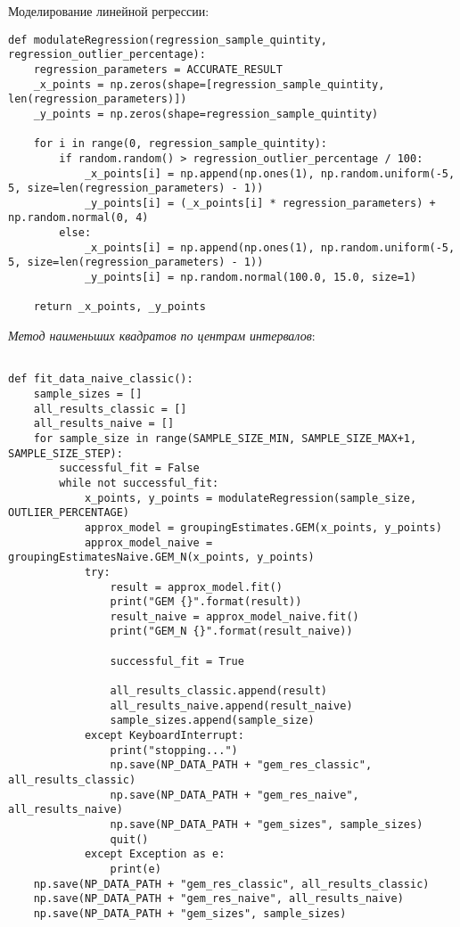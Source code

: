 Моделирование линейной регрессии:
\begin{Verbatim}[fontsize=\scriptsize]
    def modulateRegression(regression_sample_quintity, regression_outlier_percentage):
    regression_parameters = ACCURATE_RESULT
    _x_points = np.zeros(shape=[regression_sample_quintity, len(regression_parameters)])
    _y_points = np.zeros(shape=regression_sample_quintity)

    for i in range(0, regression_sample_quintity):
        if random.random() > regression_outlier_percentage / 100:
            _x_points[i] = np.append(np.ones(1), np.random.uniform(-5, 5, size=len(regression_parameters) - 1))
            _y_points[i] = (_x_points[i] * regression_parameters) + np.random.normal(0, 4)
        else:
            _x_points[i] = np.append(np.ones(1), np.random.uniform(-5, 5, size=len(regression_parameters) - 1))
            _y_points[i] = np.random.normal(100.0, 15.0, size=1)

    return _x_points, _y_points
\end{Verbatim}

\textit{Метод наименьших квадратов по центрам интервалов}:
\begin{Verbatim}[fontsize=\scriptsize]

def fit_data_naive_classic():
    sample_sizes = []
    all_results_classic = []
    all_results_naive = []
    for sample_size in range(SAMPLE_SIZE_MIN, SAMPLE_SIZE_MAX+1, SAMPLE_SIZE_STEP):
        successful_fit = False
        while not successful_fit:
            x_points, y_points = modulateRegression(sample_size, OUTLIER_PERCENTAGE)
            approx_model = groupingEstimates.GEM(x_points, y_points)
            approx_model_naive = groupingEstimatesNaive.GEM_N(x_points, y_points)
            try:
                result = approx_model.fit()
                print("GEM {}".format(result))
                result_naive = approx_model_naive.fit()
                print("GEM_N {}".format(result_naive))

                successful_fit = True

                all_results_classic.append(result)
                all_results_naive.append(result_naive)
                sample_sizes.append(sample_size)
            except KeyboardInterrupt:
                print("stopping...")
                np.save(NP_DATA_PATH + "gem_res_classic", all_results_classic)
                np.save(NP_DATA_PATH + "gem_res_naive", all_results_naive)
                np.save(NP_DATA_PATH + "gem_sizes", sample_sizes)
                quit()
            except Exception as e:
                print(e)
    np.save(NP_DATA_PATH + "gem_res_classic", all_results_classic)
    np.save(NP_DATA_PATH + "gem_res_naive", all_results_naive)
    np.save(NP_DATA_PATH + "gem_sizes", sample_sizes)

\end{Verbatim}

